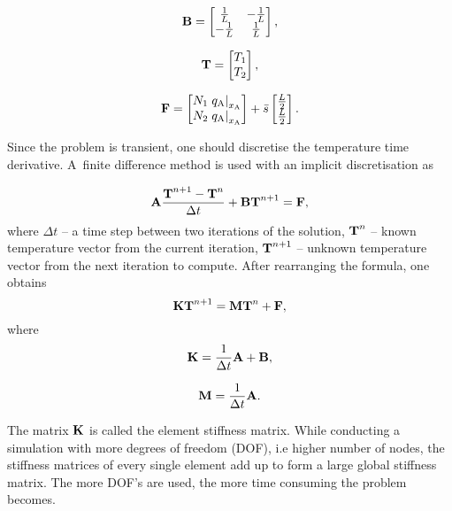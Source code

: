 \begin{equation}
    \textbf{B} = 
    \begin{bmatrix}  
    \frac{1}{L} & -\frac{1}{L} \\
    -\frac{1}{L} & \frac{1}{L}
    \end{bmatrix},
\end{equation}

\begin{equation}
    \textbf{T} = 
    \begin{bmatrix}  
    T_1 \\
    T_2
    \end{bmatrix},
\end{equation}

\begin{equation}
    \textbf{F} = 
    \begin{bmatrix}  
    N_1 \left. q_\text{A} \right|_{x_\text{A}} \\
    N_2 \left. q_\text{A} \right|_{x_\text{A}}
    \end{bmatrix} 
    + \bar s 
    \begin{bmatrix}  
    \frac{L}{2} \\
    \frac{L}{2}
    \end{bmatrix}.
\end{equation}

Since the problem is transient, one should discretise the temperature time derivative. A~finite difference method is used with an implicit discretisation as

\begin{equation}
    \textbf{A} \frac{\textbf{T}^{n+1} - \textbf{T}^n}{\Delta t} + \textbf{B} \textbf{T}^{n+1} = \textbf{F},
\end{equation}
where $\Delta t$ -- a time step between two iterations of the solution, $\textbf{T}^n$ -- known temperature vector from the current iteration, $\textbf{T}^{n+1}$ -- unknown temperature vector from the next iteration to compute. After rearranging the formula, one obtains
\begin{equation}
    \textbf{K} \textbf{T}^{n+1} =\textbf{M} \textbf{T}^{n} + \textbf{F},
\end{equation}
where 
\begin{equation}
    \textbf{K} = \frac{1}{\Delta t} \textbf{A} + \textbf{B},
\end{equation}

\begin{equation}
    \textbf{M} = \frac{1}{\Delta t} \textbf{A}.
\end{equation}

The matrix $\textbf{K}$ is called the element stiffness matrix. While conducting a simulation with more degrees of freedom (DOF), i.e higher number of nodes, the stiffness matrices of every single element add up to form a large global stiffness matrix. The more DOF's are used, the more time consuming the problem becomes.